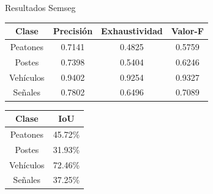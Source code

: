 \documentclass[10pt, usepdftitle=false]{beamer}
\begin{document}
\begin{frame}[fragile]{Resultados Semseg}
	\begin{center}
		\footnotesize
		\begin{tabular}{|c|c|c|c|}
			\hline
			\textbf{Clase} & \textbf{Precisión} & \textbf{Exhaustividad} & \textbf{Valor-F}\\
			\hline
			Peatones   & 0.7141 & 0.4825 & 0.5759\\
			\hline
			Postes     & 0.7398 & 0.5404 & 0.6246\\
			\hline
			Vehículos  & 0.9402 & 0.9254 & 0.9327\\
			\hline
			Señales    & 0.7802 & 0.6496 & 0.7089\\
			\hline
		\end{tabular}
	\end{center}

	\begin{center}
		\footnotesize
		\begin{tabular}{|c|c|}
			\hline
			\textbf{Clase} & \textbf{IoU}\\
			\hline
			Peatones & 45.72\%\\
			\hline
			Postes & 31.93\%\\
			\hline
			Vehículos & 72.46\%\\
			\hline
			Señales & 37.25\%\\
			\hline
		\end{tabular}
	\end{center}
\end{frame}
\end{document}
